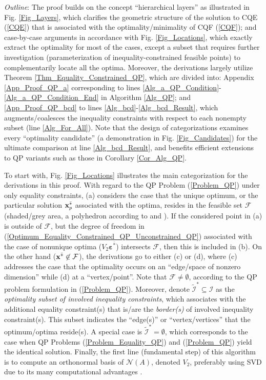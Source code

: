 \documentclass{imaman}
\newcommand{\bfx}{{\bf x}}
\newcommand{\bfvarepsilon}{{\boldsymbol \varepsilon}}
\newcommand{\calF}{{\mathcal F}}
\newcommand{\calI}{{\mathcal I}}
\newcommand{\calN}{{\mathcal N}}
\numberwithin{equation}{section}
\begin{document}
\textit{Outline}: The proof builds on the concept ``hierarchical layers'' as illustrated in Fig. \ref{Fig_Layers}, which clarifies the geometric structure of the solution to CQE (\ref{CQE}) that is associated with the optimality/minimality of CQF (\ref{CQF}); and case-by-case arguments in accordance with Fig. \ref{Fig_Locations}, which exactly extract the optimality for most of the cases, except a subset that requires further investigation (parameterization of inequality-constrained feasible points) to complementarily locate all the optima. Moreover, the derivations largely utilize Theorem \ref{Thm_Equality_Constrained_QP}, which are divided into: Appendix \ref{App_Proof_QP_a} corresponding to lines \ref{Alg_a_QP_Condition}-\ref{Alg_a_QP_Condition_End} in Algorithm \ref{Alg_QP}; and \ref{App_Proof_QP_bcd} to lines \ref{Alg_bcd}-\ref{Alg_bcd_Result}, which augments/coalesces the inequality constraints with respect to each nonempty subset (line \ref{Alg_For_All}). Note that the design of categorizations examines every ``optimality candidate'' (a demonstration in Fig. \ref{Fig_Candidates}) for the ultimate comparison at line \ref{Alg_bcd_Result}, and benefits efficient extensions to QP variants such as those in Corollary \ref{Cor_Alg_QP}.

To start with, Fig. \ref{Fig_Locations} illustrates the main categorization for the derivations in this proof. With regard to the QP Problem (\ref{Problem_QP}) under only equality constraints, (a) considers the case that the unique optimum, or the particular solution $\bfx_p^{\bar *}$ associated with the optima, resides in the feasible set $\calF$ (shaded/grey area, a polyhedron according to \cite{Lu(Ye):03(16)} and \cite{BoVa:04}). If the considered point in (a) is outside of $\calF$, but the degree of freedom in (\ref{Optimum_Equality_Constrained_QP_Unconstrained_QP}) associated with the case of nonunique optima ($V_2\bfvarepsilon^{\bar *}$) intersects $\calF$, then this is included in (b). On the other hand ($\bfx^{\bar *}\not\in\calF$), the derivations go to either (c) or (d), where (c) addresses the case that the optimality occurs on an ``edge/space of nonzero dimension'' while (d) at a ``vertex/point''. Note that $\calF\ne\emptyset$, according to the QP problem formulation in (\ref{Problem_QP}). Moreover, denote $\tilde\calI^*\subseteq\calI$ as the \textit{optimality subset of involved inequality constraints}, which associates with the additional equality constraint(s) that is/are the \textit{border(s)} of involved inequality constraint(s). This subset indicates the ``edge(s)'' or ``vertex/vertices'' that the optimum/optima reside(s). A special case is $\tilde\calI^*=\emptyset$, which corresponds to the case when QP Problems (\ref{Problem_Equality_QP}) and (\ref{Problem_QP}) yield the identical solution. Finally, the first line (fundamental step) of this algorithm is to compute an orthonormal basis of $\calN(A)$, denoted $V_2$, preferably using SVD due to its many computational advantages \cite{GoVa:13}.
\end{document}

